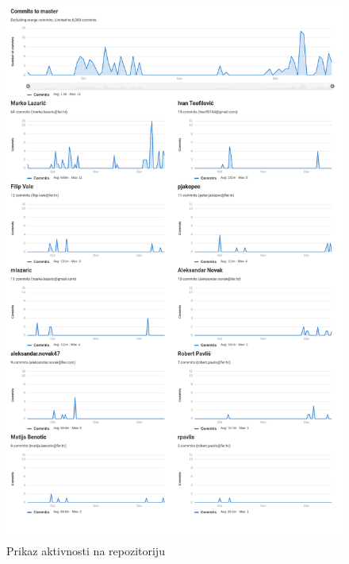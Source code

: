 		\begin{figure}[H]
    					\includegraphics[width=\textwidth,height=0.9\textheight,keepaspectratio]{slike/aktivnost}
    					\centering
    					\caption{Prikaz aktivnosti na repozitoriju}
    					\label{fig:aktivnost}
    		            \end{figure}
		
		
		
		
	